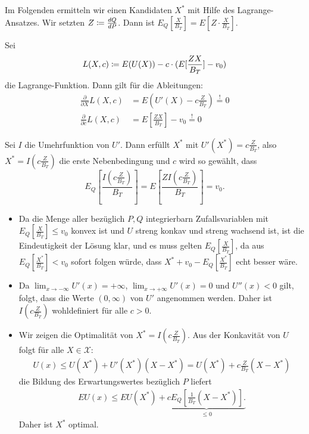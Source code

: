 \documentclass[a4paper,twoside,DIV15,BCOR12mm]{scrbook}
\newcommand{\cX}{\mathcal X}
\begin{document}
Im Folgenden ermitteln wir einen Kandidaten $X^*$ mit Hilfe des Lagrange-Ansatzes. Wir setzten $Z \da \frac{dQ}{dP}$. Dann ist $E_Q[\frac X{B_T}] = E[Z\cdot \frac{X}{B_T}]$.

Sei
\[
L(X,c) \da E(U(X)) - c\cdot (E[\frac{ZX}{B_T}] - v_0)
\]
die Lagrange-Funktion. Dann gilt für die Ableitungen:
\begin{align*}
\frac\partial{\partial X} L(X,c) &= E(U'(X) - c \frac Z{B_T}) \stackrel!= 0 \\
\frac\partial{\partial c} L(X,c) &= E[\frac{ZX}{B_T}] - v_0 \stackrel!= 0
\end{align*}

Sei $I$ die Umehrfunktion von $U'$. Dann erfüllt $X^*$ mit $U'(X^*) = c \frac{Z}{B_T}$, also $X^* = I(c \frac{Z}{B_T})$ die erste Nebenbedingung und $c$ wird so gewählt, dass 
\[
E_Q[\frac{I(c\frac{Z}{B_T})}{B_T}] = E[\frac{Z I(c\frac{Z}{B_T})}{B_T}] = v_0.
\]

\begin{bemerkung}
\begin{itemize}
\item Da die Menge aller bezüglich $P,Q$ integrierbarn Zufallsvariablen mit $E_Q[\frac{X}{B_T}] \le v_0$ konvex ist und $U$ streng konkav und streng wachsend ist, ist die Eindeutigkeit der Lösung klar, und es muss gelten $E_Q[\frac{X}{B_T}]$, da aus $E_Q[\frac{X^*}{B_T}] < v_0$ sofort folgen würde, dass $X^* + v_0 - E_Q[\frac{X^*}{B_T}]$ echt besser wäre.
\item Da $\lim_{x\to-\infty}U'(x) = +\infty$, $\lim_{x\to +\infty}U'(x)=0$ und $U''(x) <0$ gilt, folgt, dass die Werte $(0,\infty)$ von $U'$ angenommen werden. Daher ist $I(c\frac{Z}{B_T})$ wohldefiniert für alle $c>0$.
\item Wir zeigen die Optimalität von $X^* = I(c\frac{Z}{B_T})$. Aus der Konkavität von $U$ folgt für alle $X\in\cX$:
\begin{align*}
U(x) \le U(X^*) + U'(X^*)(X-X^*) = U(X^*) + c\frac{Z}{B_T}(X-X^*)
\end{align*}
die Bildung des Erwartungswertes bezüglich $P$ liefert
\begin{align*}
EU(x) \le EU(X^*) + \underbrace{c E_Q[\frac{1}{B_T}(X-X^*)].}_{\le 0}
\end{align*}
Daher ist $X^*$ optimal.
\end{itemize}
\end{bemerkung}
\end{document}
